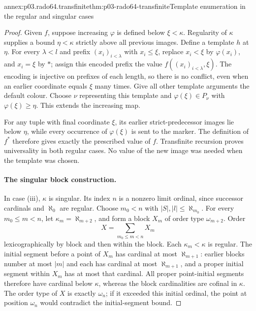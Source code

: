 \begin{annexitem}{annex:p03.rado64.transfinite}{thm:p03-rado64-transfinite}{Template enumeration in the regular and singular cases}
\begin{proof}
Given \(f\), suppose increasing \(\varphi\) is defined below \(\xi<\kappa\).
Regularity of \(\kappa\) supplies a bound \(\eta<\kappa\) strictly above
all previous images. Define a template \(h\) at \(\eta\).
For every \(\lambda<l\) and prefix \((x_i)_{i<\lambda}\) with \(x_i\leq\xi\),
replace \(x_i<\xi\) by \(\varphi(x_i)\), and \(x_i=\xi\) by \(*\);
assign this encoded prefix the value \(f((x_i)_{i<\lambda},\xi)\).
The encoding is injective on prefixes of each length, so there is no
conflict, even when an earlier coordinate equals \(\xi\) many times.
Give all other template arguments the default colour.
Choose \(\nu\) representing this template and
\(\varphi(\xi)\in P_\nu\) with \(\varphi(\xi)\geq\eta\).
This extends the increasing map.

For any tuple with final coordinate \(\xi\), its earlier strict-predecessor
images lie below \(\eta\), while every occurrence of \(\varphi(\xi)\)
is sent to the marker. The definition of \(f^*\) therefore gives exactly
the prescribed value of \(f\). Transfinite recursion proves universality
in both regular cases. No value of the new image was needed when the
template was chosen.

\paragraph{The singular block construction.}
In case (iii), \(\kappa\) is singular. Its index \(n\) is a nonzero limit
ordinal, since successor cardinals and \(\aleph_0\) are regular.
Choose \(m_0<n\) with
\(|S|,|l|\leq\aleph_{m_0}\).
For every \(m_0\leq m<n\), let
\(\kappa_m=\aleph_{m+2}\), and form a block \(X_m\) of order type
\(\omega_{m+2}\). Order
\[
 X=\sum_{m_0\leq m<n}X_m
\]
lexicographically by block and then within the block.
Each \(\kappa_m<\kappa\) is regular.
The initial segment before a point of \(X_m\) has cardinal at most
\(\aleph_{m+1}\): earlier blocks number at most \(|m|\) and each has
cardinal at most \(\aleph_{m+1}\), and a proper initial segment within
\(X_m\) has at most that cardinal.
All proper point-initial segments therefore have cardinal below \(\kappa\),
whereas the block cardinalities are cofinal in \(\kappa\).
The order type of \(X\) is exactly \(\omega_n\); if it exceeded this initial
ordinal, the point at position \(\omega_n\) would contradict the
initial-segment bound.


\end{proof}
\end{annexitem}

